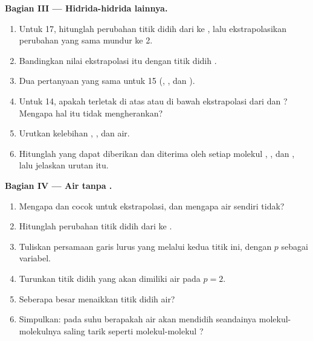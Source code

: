 \begin{problem}
\medskip
\noindent\textbf{Bagian III --- Hidrida-hidrida lainnya.}
\begin{enumerate}[resume]
  \item Untuk  17, hitunglah perubahan titik didih dari 
        ke , lalu ekstrapolasikan perubahan yang sama mundur ke
         2.
  \item Bandingkan nilai ekstrapolasi itu dengan titik didih .
  \item Dua pertanyaan yang sama untuk  15 (, ,
        dan ).
  \item Untuk  14, apakah  terletak di atas atau di bawah
        ekstrapolasi dari  dan ? Mengapa hal itu tidak
        mengherankan?
  \item Urutkan kelebihan , , dan air.
  \item Hitunglah  yang dapat diberikan dan diterima oleh
        setiap molekul , , dan , lalu jelaskan
        urutan itu.
\end{enumerate}

\medskip
\noindent\textbf{Bagian IV --- Air tanpa .}
\begin{enumerate}[resume]
  \item Mengapa  dan  cocok untuk ekstrapolasi, dan
        mengapa air sendiri tidak?
  \item Hitunglah perubahan titik didih dari  ke .
  \item Tuliskan persamaan garis lurus yang melalui kedua titik ini,
        dengan  $p$ sebagai variabel.
  \item Turunkan titik didih yang akan dimiliki air pada $p = 2$.
  \item Seberapa besar  menaikkan titik didih air?
  \item Simpulkan: pada suhu berapakah air akan mendidih seandainya
        molekul-molekulnya saling tarik seperti molekul-molekul ?
\end{enumerate}
\end{problem}
